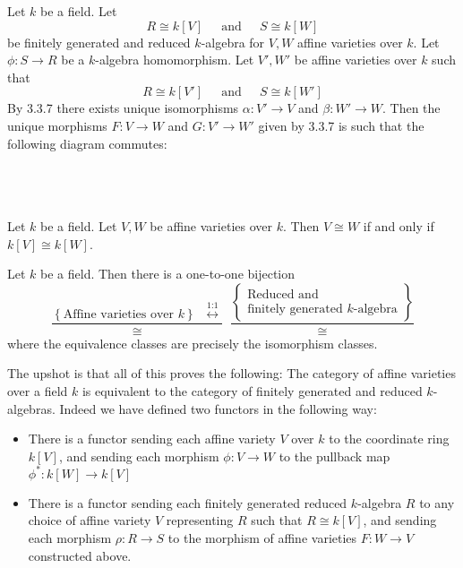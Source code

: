 \documentclass[a4paper]{article}
\begin{document}
\begin{prp}{}{} Let $k$ be a field. Let $$R\cong k[V]\;\;\;\;\text{ and }\;\;\;\; S\cong k[W]$$ be finitely generated and reduced $k$-algebra for $V,W$ affine varieties over $k$. Let $\phi:S\to R$ be a $k$-algebra homomorphism. Let $V',W'$ be affine varieties over $k$ such that $$R\cong k[V']\;\;\;\;\text{ and }\;\;\;\; S\cong k[W']$$ By 3.3.7 there exists unique isomorphisms $\alpha:V'\to V$ and $\beta:W'\to W$. Then the unique morphisms $F:V\to W$ and $G:V'\to W'$ given by 3.3.7 is such that the following diagram commutes: \\~\\
 \\~\\
\end{prp}

\begin{prp}{}{} Let $k$ be a field. Let $V,W$ be affine varieties over $k$. Then $V\cong W$ if and only if $k[V]\cong k[W]$. 
\end{prp}

\begin{crl}{}{} Let $k$ be a field. Then there is a one-to-one bijection $$\frac{\left\{\text{Affine varieties over }k\right\}\;\;\overset{\text{1:1}}{\longleftrightarrow}}{\cong}\;\;\frac{\left\{\substack{\text{Reduced and }\\\text{finitely generated }k\text{-algebra}}\right\}}{\cong}$$ where the equivalence classes are precisely the isomorphism classes. 
\end{crl}


The upshot is that all of this proves the following: The category of affine varieties over a field $k$ is equivalent to the category of finitely generated and reduced $k$-algebras. Indeed we have defined two functors in the following way:
\begin{itemize}
\item There is a functor sending each affine variety $V$ over $k$ to the coordinate ring $k[V]$, and sending each morphism $\phi:V\to W$ to the pullback map $\phi^\ast:k[W]\to k[V]$
\item There is a functor sending each finitely generated reduced $k$-algebra $R$ to any choice of affine variety $V$ representing $R$ such that $R\cong k[V]$, and sending each morphism $\rho:R\to S$ to the morphism of affine varieties $F:W\to V$ constructed above. 
\end{itemize}
\end{document}
